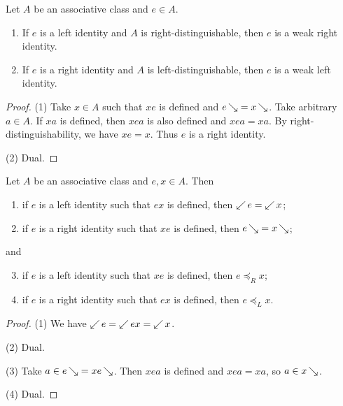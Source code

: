 \begin{lemma} \label{distinguishableIdentity}
Let $A$ be an associative class and $e\in A$.
\begin{enumerate}
\item If $e$ is a left identity and $A$ is right-distinguishable, then $e$ is a weak right identity.
\item If $e$ is a right identity and $A$ is left-distinguishable, then $e$ is a weak left identity.
\end{enumerate}
\end{lemma}
\begin{proof}
(1) Take $x\in A$ such that $xe$ is defined and $e\mathop{\searrow} = x\mathop{\searrow}$. Take arbitrary $a\in A$. If $xa$ is defined, then $xea$ is also defined and $xea = xa$. By right-distinguishability, we have $xe = x$. Thus $e$ is a right identity.

(2) Dual.
\end{proof}

\begin{lemma} \label{identityConnection}
Let $A$ be an associative class and $e,x\in A$. Then
\begin{enumerate}
\item if $e$ is a left identity such that $ex$ is defined, then $\mathop{\swarrow}e = \mathop{\swarrow}x$;
\item if $e$ is a right identity such that $xe$ is defined, then $e\mathop{\searrow} = x\mathop{\searrow}$;
\end{enumerate}
and
\begin{enumerate} \setcounter{enumi}{2}
\item if $e$ is a left identity such that $xe$ is defined, then $e \preceq_R x$;
\item if $e$ is a right identity such that $ex$ is defined, then $e \preceq_L x$.
\end{enumerate}
\end{lemma}
\begin{proof}
(1) We have $\mathop{\swarrow}e = \mathop{\swarrow}ex = \mathop{\swarrow}x$.

(2) Dual.

(3) Take $a\in e\mathop{\searrow} = xe\mathop{\searrow}$. Then $xea$ is defined and $xea = xa$, so $a\in x\mathop{\searrow}$.

(4) Dual.
\end{proof}


